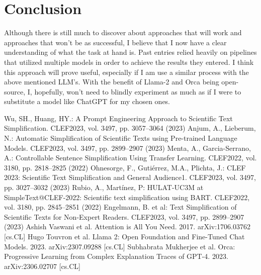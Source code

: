 \documentclass[runningheads]{llncs}
\begin{document}
\section{Conclusion}
Although there is still much to discover about approaches that will work and approaches that won't be as successful, I believe that I now have a clear understanding of what the task at hand is. Past entries relied heavily on pipelines that utilized multiple models in order to achieve the results they entered. I think this approach will prove useful, especially if I am use a similar process with the above mentioned LLM's. With the benefit of Llama-2 and Orca being open-source, I, hopefully, won't need to blindly experiment as much as if I were to substitute a model like ChatGPT for my chosen ones.
%
%
%
% 
% 
%
\begin{thebibliography}{9}
Wu, SH., Huang, HY.: A Prompt Engineering Approach to Scientific Text Simplification. CLEF2023, vol. 3497, pp. 3057--3064 (2023)
Anjum, A., Lieberum, N.: Automatic Simplification of Scientific Texts using Pre-trained Language Models. CLEF2023, vol. 3497, pp. 2899--2907 (2023)
Menta, A., Garcia-Serrano, A.: Controllable Sentence Simplification Using Transfer Learning. CLEF2022, vol. 3180, pp. 2818--2825 (2022)
Ohnesorge, F., Gutiérrez, M.A., Plichta, J.: CLEF 2023: Scientific Text Simplification and General Audience1. CLEF2023, vol. 3497, pp. 3027--3032 (2023)
Rubio, A., Martínez, P: HULAT-UC3M at SimpleText@CLEF-2022: Scientific text simplification using BART. CLEF2022, vol. 3180, pp. 2845--2851 (2022)
Engelmann, B. et al: Text Simplification of Scientific Texts for Non-Expert Readers.  CLEF2023, vol. 3497, pp. 2899--2907 (2023)
Ashish Vaswani et al. Attention is All You Need. 2017. arXiv:1706.03762 [cs.CL]
Hugo Touvron et al. Llama 2: Open Foundation and Fine-Tuned Chat Models. 2023. arXiv:2307.09288 [cs.CL]
Subhabrata Mukherjee et al. Orca: Progressive Learning from Complex Explanation Traces of GPT-4. 2023.  	arXiv:2306.02707 [cs.CL]

\end{thebibliography}
\end{document}
